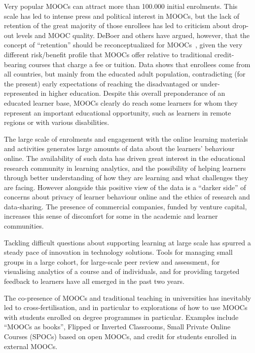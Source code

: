 Very popular MOOCs can attract
more than 100.000 initial enrolments.  This scale has led to intense press
and political interest in MOOCs, but the lack of retention of the great
majority of those enrollees has led to
criticism about drop-out levels and MOOC quality.  
DeBoer and others have argued, however, that the concept of ``retention''
should be reconceptualized for MOOCs~\cite{deboer-ho-reconceptualizing},
given the very different 
risk/benefit profile that MOOCs offer relative to traditional
credit-bearing courses
that charge a fee or tuition.
Data shows that enrollees come from all countries, but mainly from the
educated adult population, contradicting (for the present) early
expectations of reaching the disadvantaged or under-represented in
higher education.  Despite this overall preponderance of an educated
learner base, MOOCs clearly do reach some learners for whom they
represent an important educational opportunity, such as learners in
remote regions or
with various disabilities.

The large scale of enrolments and engagement with the online learning
materials and activities generates large amounts of data about the
learners' behaviour online.  The availability of such data has driven
great interest in the educational research community in learning
analytics, and the possibility of helping learners through better
understanding of how they are learning and what challenges they are
facing.  However alongside this positive view of the data is a ``darker
side'' of concerns about privacy of learner behaviour online and the
ethics of research and data-sharing.  The presence of commercial
companies, funded by venture capital, increases this sense of discomfort
for some in the academic and learner communities.

Tackling difficult questions about supporting learning
at large scale has spurred a steady pace of innovation in
technology solutions.  Tools for managing small groups in a large
cohort, for large-scale peer review and assessment, for visualising
analytics of a course and of individuals, and for providing targeted
feedback 
to learners have all emerged in the past two years.  

The co-presence of MOOCs and traditional teaching in universities has
inevitably led to cross-fertilisation, and in particular to explorations
of how to use MOOCs with students enrolled on degree programmes in
particular.  Examples include ``MOOCs as books'', Flipped or Inverted
Classrooms, Small Private Online Courses (SPOCs) based on open MOOCs,
and credit for students enrolled in external MOOCs.

